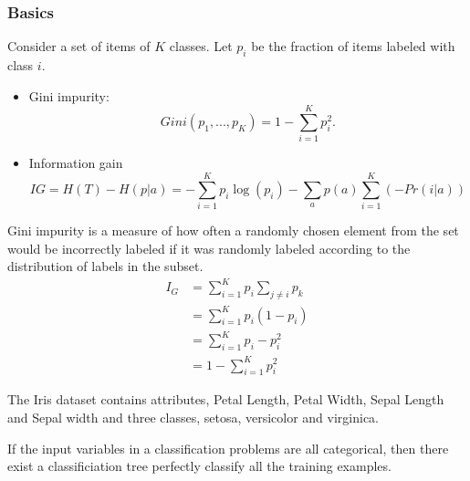 \begin{refsection}
\subsubsection{Basics}


\begin{method}
Consider a set of items of $K$ classes. Let $p_i$ be the fraction of items labeled with class $i$. 


\begin{itemize}
	\item Gini impurity: 
	$$Gini(p_1,...,p_K) = 1 - \sum_{i=1}^K p_i^2.$$
	\item Information gain
	$$IG = H(T) - H(p|a) = -\sum_{i=1}^K p_i\log(p_i) - \sum_a p(a)\sum_{i=1}^K(-Pr(i|a))$$
\end{itemize}	
\end{method}

\begin{remark}
Gini impurity is a measure of how often a randomly chosen element from the set would be incorrectly labeled if it was randomly labeled according to the distribution of labels in the subset.	
\begin{align*}
I_G &= \sum_{i=1}^K p_i \sum_{j\neq i}p_k\\
&=\sum_{i=1}^K p_i(1-p_i) \\
&=\sum_{i=1}^K p_i-p_i^2 \\
&=1 - \sum_{i=1}^K p_i^2
\end{align*}	
\end{remark}


\begin{remark}
The Iris dataset contains attributes, Petal Length, Petal Width, Sepal Length and Sepal width and three classes, setosa, versicolor and virginica.	

\end{remark}




\begin{remark}
If the input variables in a classification problems are all categorical, then there exist a classificiation tree perfectly classify all the training examples.	
\end{remark}




\end{refsection}
